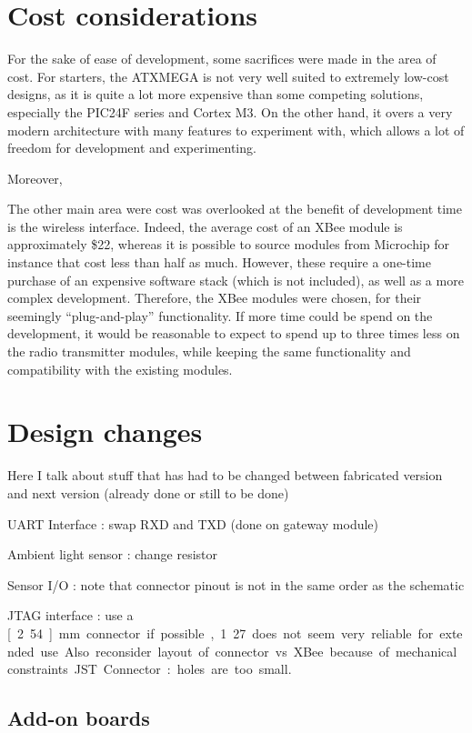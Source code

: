 \section{Cost considerations}

For the sake of ease of development, some sacrifices were made in the area of
cost. For starters, the ATXMEGA is not very well suited to extremely low-cost
designs, as it is quite a lot more expensive than some competing solutions,
especially the PIC24F series and Cortex M3. On the other hand, it overs a very
modern architecture with many features to experiment with, which allows a lot of
freedom for development and experimenting.

Moreover,

The other main area were cost was overlooked at the benefit of development time
is the wireless interface. Indeed, the average cost of an XBee module is
approximately \$22, whereas it is possible to source modules from Microchip for
instance that cost less than half as much. However, these require a one-time
purchase of an expensive software stack (which is not included), as well as a
more complex development. Therefore, the XBee modules were chosen, for their
seemingly ``plug-and-play'' functionality. If more time could be spend on the
development, it would be reasonable to expect to spend up to three times less on
the radio transmitter modules, while keeping the same functionality and
compatibility with the existing modules.

\section{Design changes}
Here I talk about stuff that has had to be changed between fabricated version
and next version (already done or still to be done)

UART Interface : swap RXD and TXD (done on gateway module)

Ambient light sensor : change resistor

Sensor I/O : note that connector pinout is not in the same order as the
schematic

JTAG interface : use a \unit[2.54]{mm} connector if possible, 1.27 does not seem
very reliable for extended use. Also reconsider layout of connector vs XBee
because of mechanical constraints

JST Connector : holes are too small.

\subsection{Add-on boards}

